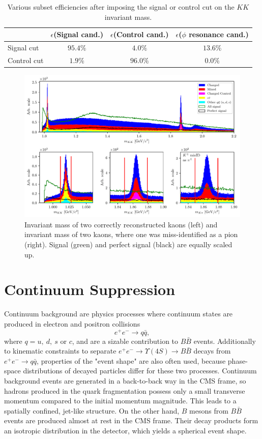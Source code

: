 \begin{table}[H]
	\centering
	\begin{tabular}{l|c|c|c}
		& $\epsilon$(Signal cand.)& $\epsilon$(Control cand.) & $\epsilon$($\phi$ resonance cand.)\\
		\toprule
		Signal cut & $95.4\%$ & $4.0\%$ & $13.6\%$ \\
		Control cut & $1.9\%$ & $96.0\%$ & $0.0\%$ \\
		\bottomrule
	\end{tabular}
	\caption{Various subset efficiencies after imposing the signal or control cut on the $KK$ invariant mass.}
	\label{tab:cut_eff}
\end{table}


\begin{figure}[H]
	\centering
	\captionsetup{width=0.8\linewidth}
	\includegraphics[width=\linewidth]{fig/res_bkg}
	\caption{Invariant mass of two correctly reconstructed kaons (left) and invariant mass of two kaons, where one was miss-identified as a pion (right). Signal (green) and perfect signal (black) are equally scaled up.}
	\label{fig:res_bkg}
\end{figure}


\section{Continuum Suppression}

Continuum background are physics processes where continuum states are produced in electron and positron collisions $$e^+ e^- \to q \bar q,$$ 
where $q = u,~d,~s$ or $c$, and are a sizable contribution to $B \bar B$ events. Additionally to kinematic constraints to separate $e^+ e^- \to \Upsilon(4S) \to B \bar B$ decays from $e^+ e^- \to q \bar q$, properties of the "event shape" are also often used, because phase-space distributions of decayed particles differ for these two processes. Continuum background events are generated in a back-to-back way in the CMS frame, so hadrons produced in the quark fragmentation possess only a small transverse momentum compared to the initial momentum magnitude. This leads to a spatially confined, jet-like structure. On the other hand, $B$ mesons from $B \bar B$ events are produced almost at rest in the CMS frame. Their decay products form an isotropic distribution in the detector, which yields a spherical event shape.

